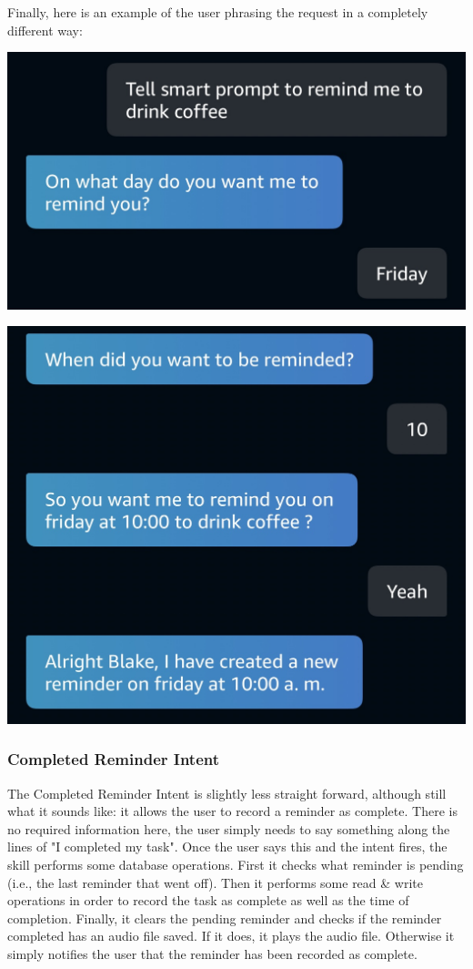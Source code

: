 \documentclass[11pt, oneside]{article}
\begin{document}
Finally, here is an example of the user phrasing the request in a completely different way:
\begin{center}
  \includegraphics[width=\linewidth * 3/4]{images/createReminder3a.jpg}
\end{center}
\begin{center}
  \includegraphics[width=\linewidth * 3/4]{images/createReminder3b.jpg}
\end{center}

\subsubsection{Completed Reminder Intent}

The Completed Reminder Intent is slightly less straight forward, although still what it sounds like: it allows the user to record a reminder as complete. 
There is no required information here, the user simply needs to say something along the lines of "I completed my task". 
Once the user says this and the intent fires, the skill performs some database operations. 
First it checks what reminder is pending (i.e., the last reminder that went off). 
Then it performs some read \& write operations in order to record the task as complete as well as the time of completion. 
Finally, it clears the pending reminder and checks if the reminder completed has an audio file saved. 
If it does, it plays the audio file. 
Otherwise it simply notifies the user that the reminder has been recorded as complete. 
\end{document}

